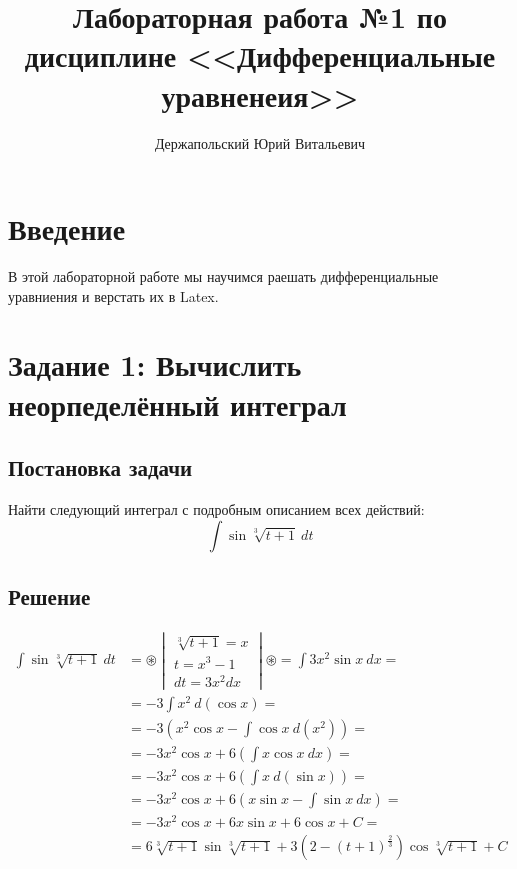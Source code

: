 \documentclass[14pt, a4paper, titlepage, fleqn]{extarticle}
\title{Лабораторная работа №1 по дисциплине <<Дифференциальные уравненеия>>}
\author{Держапольский Юрий Витальевич}
\begin{document}
    \maketitle

    \tableofcontents

    \pagebreak

    \section{Введение}
        В этой лабораторной работе мы научимся раешать дифференциальные
        уравниения и верстать их в Latex. %

    \pagebreak

    \section{Задание 1: Вычислить неорпеделённый интеграл}
        \subsection{Постановка задачи}
            Найти следующий интеграл с подробным описанием всех действий:
            \[ \int \sin{ \sqrt[3]{t+1} } ~ dt \]
        
        \subsection{Решение}
        \[
            \begin{split}
                \int \sin{ \sqrt[3]{t+1} } ~ dt &= \circledast
                \begin{vmatrix}
                    \sqrt[3]{t+1} = x \\
                    t = x^3 - 1 \\
                    dt = 3x^2dx 
                \end{vmatrix}
                \circledast = \int 3x^2\sin{x} ~ dx = \\
                &= -3 \int x^2 ~ d(\cos{x}) = \\
                &= -3 \left( 
                    x^2\cos{x} - \int \cos{x} ~ d \left(x^2\right) 
                \right) = \\
                &= -3x^2\cos{x} + 6\left(\int x \cos{x} ~ dx\right) = \\
                &= -3x^2\cos{x} + 6\left(\int x ~ d(\sin{x})\right) = \\
                &= -3x^2\cos{x} + 6\left(x\sin{x} - \int \sin{x} ~ dx \right)=\\
                &= -3x^2\cos{x} + 6x\sin{x} + 6\cos{x} + C =\\
                &= 6 \sqrt[3]{t+1} \sin{\sqrt[3]{t+1}} + 
                    3\left(2 - (t+1)^{\frac{2}{3}}\right) \cos{\sqrt[3]{t+1}}+C
            \end{split}    
        \]
\end{document}
